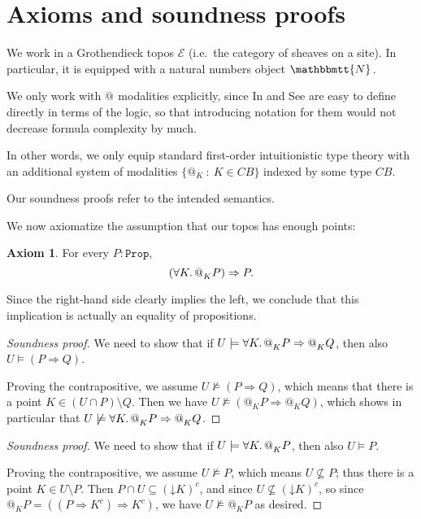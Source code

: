 \documentclass[11pt, oneside, article]{memoir}
\makeatletter
\newcommand{\dis}[1]{\todo[color=red!40,inline]{\textbf{D:} #1}}
\theoremstyle{plain}
\theoremstyle{definition}
\newtheorem{axiom}{Axiom}
\theoremstyle{remark}
\newenvironment{soundproof}{\begin{proof}[Soundness proof]}{\end{proof}}
\renewcommand{\ss}{\subseteq}
\newcommand{\const}[1]{\mathtt{#1}}
\newcommand{\cat}[1]{\mathcal{#1}}
\newcommand{\internal}[1]{\raisebox{-.03ex}{$\mathbbmtt{#1}$}}
\newcommand{\hs}{\hspace{1.1pt}}
\newcommand{\tNN}{\internal{N}\hs}
\newcommand{\Prop}{\const{Prop}}
\newcommand{\BaseSpace}{B}
\newcommand{\CB}{C\BaseSpace}
\newcommand{\AtSymbol}{{@}}
\newcommand{\At}[2][]{\AtSymbol^{#1}_{#2}}
\newcommand{\down}{\mathord{\downarrow}}
\newcommand{\imp}{\Rightarrow}
\makeatother
\begin{document}
\section{Axioms and soundness proofs}

We work in a Grothendieck topos $\cat{E}$ (i.e.\ the category of sheaves on a site). In particular, it is equipped with a natural numbers object $\tNN$.

We only work with $\At{}$ modalities explicitly, since In and See are easy to define directly in terms of the logic, so that introducing notation for them would not decrease formula complexity by much.

In other words, we only equip standard first-order intuitionistic type theory with an additional system of modalities $\{ \At{K} \: : \: K\in \CB\}$ indexed by some type $\CB$. 

Our soundness proofs refer to the intended semantics.

We now axiomatize the assumption that our topos has enough points:

\begin{axiom}\label{ax.enough_points}
For every $P:\Prop$,
\[
	(\forall K\ldotp \At{K} P) \imp P.
\]
\end{axiom}

Since the right-hand side clearly implies the left, we conclude that this implication is actually an equality of propositions.


\begin{soundproof}
	We need to show that if $U \models \forall K\ldotp \At{K} P \imp \At{K} Q$, then also $U \models (P \imp Q)$.

	Proving the contrapositive, we assume $U \not\models (P \imp Q)$, which means that there is a point $K \in (U\cap P)\setminus Q$. Then we have $U \not\models (\At{K} P \imp \At{K} Q)$, which shows in particular that $U\not\models \forall K\ldotp \At{K} P \imp \At{K} Q$.
\end{soundproof}

\dis{Does the following work?}
\begin{soundproof}
	We need to show that if $U \models \forall K\ldotp \At{K} P$, then also $U \models P$.

	Proving the contrapositive, we assume $U \not\models P$, which means $U\not\ss P$; thus there is a point $K \in U\setminus P$. Then $P\cap U\ss(\down K)^c$, and since $U\not\ss (\down K)^c$, so since $\At{K}P=((P \imp K^c) \imp K^c)$, we have $U \not\models \At{K} P$ as desired.
\end{soundproof}
\end{document}
